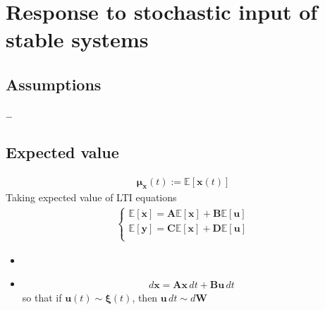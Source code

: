 \documentclass[letterpaper,10pt,english]{jupyterBook}
\begin{document}
\section{Response to stochastic input of stable systems}
\label{\detokenize{ch/system-theory/lti-response:response-to-stochastic-input-of-stable-systems}}\label{\detokenize{ch/system-theory/lti-response:ode-lti-response-stochastic}}

\subsection{Assumptions}
\label{\detokenize{ch/system-theory/lti-response:assumptions}}
\sphinxAtStartPar
…


\subsection{Expected value}
\label{\detokenize{ch/system-theory/lti-response:expected-value}}\begin{equation*}
\begin{split}\boldsymbol{\mu}_{\mathbf{x}}(t) := \mathbb{E}[ \mathbf{x}(t) ]\end{split}
\end{equation*}
\sphinxAtStartPar
Taking expected value of LTI equations
\begin{equation*}
\begin{split}\begin{cases}
  \mathbb{E}[\dot{\mathbf{x}}] = \mathbf{A} \mathbb{E}[\mathbf{x}] + \mathbf{B} \mathbb{E}[\mathbf{u}] \\
  \mathbb{E}[     \mathbf{y} ] = \mathbf{C} \mathbb{E}[\mathbf{x}] + \mathbf{D} \mathbb{E}[\mathbf{u}] \\
\end{cases}\end{split}
\end{equation*}
\sphinxAtStartPar
{}
\begin{itemize}
\item {} 
\sphinxAtStartPar
{}

\item {} 
\sphinxAtStartPar
{}
\begin{equation*}
\begin{split}d \mathbf{x} = \mathbf{A} \mathbf{x} \, d t + \mathbf{B} \mathbf{u} \, d t\end{split}
\end{equation*}
\sphinxAtStartPar
so that if \(\mathbf{u}(t) \sim \boldsymbol{\xi}(t)\), then \(\mathbf{u} \, dt \sim d \mathbf{W}\)

\end{itemize}
\end{document}
